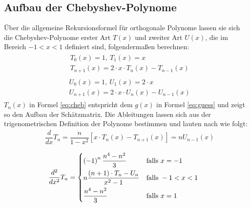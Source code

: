 \subsection{Aufbau der Chebyshev-Polynome}
Über die allgemeine Rekursionsformel für orthogonale Polynome \citep{Abramowitz-1972} lassen sie sich die Chebyshev-Polynome erster Art $T(x)$ und zweiter Art $U(x)$, die im Bereich $-1 < x < 1$ definiert sind, folgendermaßen berechnen:
\begin{align}
\begin{split}
& T_0(x) = 1, \: T_1(x) = x \\
& T_{n+1}(x) = 2 \cdot x \cdot T_n(x) - T_{n-1}(x)
\end{split}
\end{align} 
\begin{align}
\begin{split}
& U_0(x) = 1, \: U_1(x) = 2 \cdot x \\ 
& U_{n+1}(x) = 2 \cdot x \cdot U_n(x) - U_{n-1}(x)
\end{split}
\end{align}
$T_n(x)$ in Formel \ref{eq:cheb} entspricht dem $g(x)$ in Formel \ref{eq:guess} und zeigt so den Aufbau der Schätzmatrix. Die Ableitungen lassen sich aus der trigenometrischen Definition der Polynome bestimmen und lauten nach \citet{spanier-1987} wie folgt:
\begin{align}
& \dfrac{d}{dx} T_n = \dfrac{n}{1-x^2} \left[ x \cdot T_n \left( x \right) - T_{n+1} \left( x \right) \right] = nU_{n-1} \left( x \right)
\end{align} 

\begin{align}
& \dfrac{d^2}{dx^2} T_n = 
  \begin{dcases} 
   \left(-1\right)^{n} \dfrac{n^4 - n^2}{3}  & \text{falls } x = -1 \\
   n \dfrac{(n+1) \cdot T_n - U_n}{x^2 - 1} & \text{falls } -1 < x < 1 \\
   \dfrac{n^4 - n^2}{3}                      & \text{falls } x = 1
  \end{dcases}
\end{align} 

